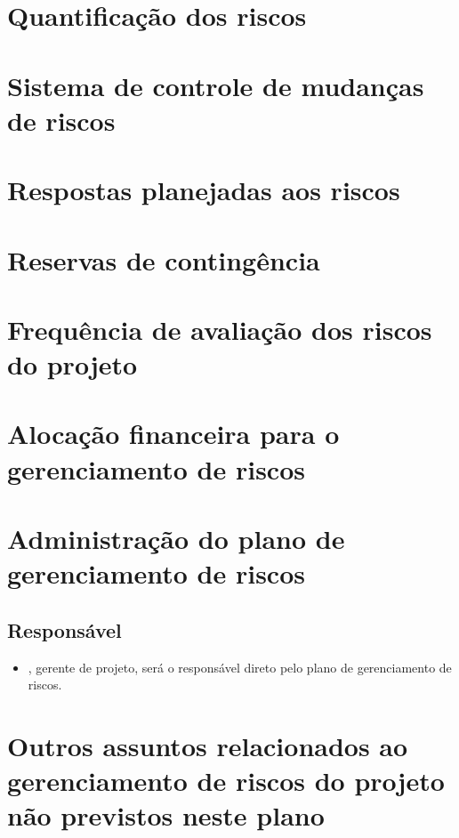 \section{Quantificação dos riscos}

\section{Sistema de controle de mudanças de riscos}
\label{sec:risk-change-control-system}

\section{Respostas planejadas aos riscos}

\section{Reservas de contingência}

\section{Frequência de avaliação dos riscos do projeto}

\section{Alocação financeira para o gerenciamento de riscos}

\section{Administração do plano de gerenciamento de riscos}

\subsection{Responsável}

\begin{itemize}
	\item \projectManagerName{}, gerente de projeto, será o responsável direto pelo plano de gerenciamento de riscos.
\end{itemize}

\section{Outros assuntos relacionados ao gerenciamento de riscos do projeto não previstos neste plano}

